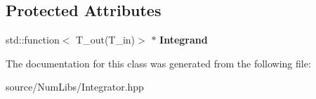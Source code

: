 \subsection*{Protected Attributes}
\begin{DoxyCompactItemize}
\item 
\hypertarget{class_c___integrator___line_a9cd6c7764ef843fc38521254ebdc3ada}{std\-::function$<$ T\-\_\-out(T\-\_\-in)$>$ $\ast$ {\bfseries Integrand}}\label{class_c___integrator___line_a9cd6c7764ef843fc38521254ebdc3ada}

\end{DoxyCompactItemize}


The documentation for this class was generated from the following file\-:\begin{DoxyCompactItemize}
\item 
source/\-Num\-Libs/Integrator.\-hpp\end{DoxyCompactItemize}

